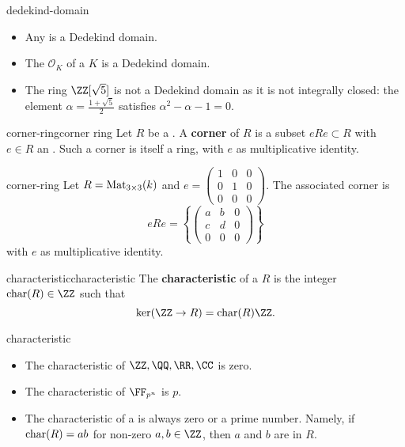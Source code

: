 \begin{example}{dedekind-domain}
    \begin{itemize}
        \item Any  is a Dedekind domain.
        \item The  $\mathcal{O}_K$ of a  $K$ is a Dedekind domain.
        \item The ring $\ZZ[\sqrt{5}]$ is not a Dedekind domain as it is not integrally closed: the element $\alpha = \frac{1 + \sqrt{5}}{2}$ satisfies $\alpha^2 - \alpha - 1 = 0$.
    \end{itemize}
\end{example}

\begin{topic}{corner-ring}{corner ring}
    Let $R$ be a . A \textbf{corner} of $R$ is a subset $eRe \subset R$ with $e \in R$ an . Such a corner is itself a ring, with $e$ as multiplicative identity.
\end{topic}

\begin{example}{corner-ring}
    Let $R = \textup{Mat}_{3 \times 3}(k)$ and $e = \begin{pmatrix} 1 & 0 & 0 \\ 0 & 1 & 0 \\ 0 & 0 & 0 \end{pmatrix}$. The associated corner is
    \[ eRe = \left\{ \begin{pmatrix} a & b & 0 \\ c & d & 0 \\ 0 & 0 & 0 \end{pmatrix} \right\} \]
    with $e$ as multiplicative identity.
\end{example}

\begin{topic}{characteristic}{characteristic}
    The \textbf{characteristic} of a  $R$ is the integer $\textup{char}(R) \in \ZZ$ such that
    \[ \ker(\ZZ \to R) = \textup{char}(R) \ZZ . \]
\end{topic}

\begin{example}{characteristic}
    \begin{itemize}
        \item The characteristic of $\ZZ, \QQ, \RR, \CC$ is zero.
        \item The characteristic of $\FF_{p^n}$ is $p$.
        \item The characteristic of a  is always zero or a prime number. Namely, if $\textup{char}(R) = ab$ for non-zero $a, b \in \ZZ$, then $a$ and $b$ are  in $R$.
    \end{itemize}
\end{example}

